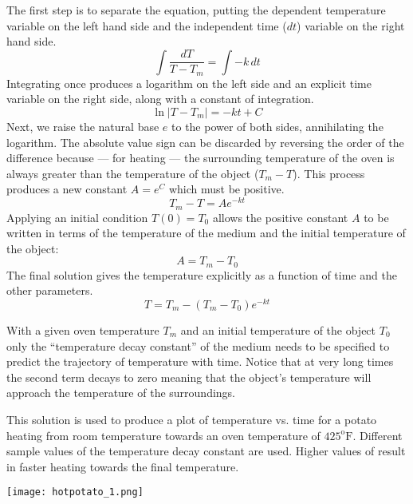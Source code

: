 \documentclass{ximera}
\begin{document}
The first step is to separate the equation, putting the dependent temperature variable on the left hand side and the independent time ($dt$)  variable on the right hand side.
\[
\int\frac{dT}{T-T_m}=\int -k\,dt
\]
Integrating once produces a logarithm on the left side and an explicit time variable on the right side, along with a constant of integration.
\[
\ln|T-T_m|=-kt+C
\]
Next, we raise the natural base $e$ to the power of both sides, annihilating the logarithm.  The absolute value sign can be discarded by reversing the order of the difference because --- for heating --- the surrounding temperature of the oven is always greater than the temperature of the object ($T_m-T$). This process produces a new constant $A=e^C$ which must be positive.
\[
T_m-T=Ae^{-kt}
\] 
Applying an initial condition $T(0)=T_0$ allows the positive constant $A$ to be written in terms of the temperature of the medium and the initial temperature of the object:
\[
A=T_m-T_0
\]
The final solution gives the temperature explicitly as a function of time and the other parameters.
\[
T=T_m-(T_m-T_0)e^{-kt}
\]

With a given oven temperature $T_m$ and an initial temperature of the object $T_0$ only the ``temperature decay constant'' of the medium  needs to be specified to predict the trajectory of temperature with time.  Notice that at very long times the second term decays to zero meaning that the object's temperature will approach the temperature of the surroundings.

This solution is used to produce a plot of temperature vs. time for a potato heating from room temperature towards an oven temperature of $425^{\text{o}}\text{F}$.  Different sample values of the temperature decay constant  are used.  Higher values of  result in faster heating towards the final temperature.

\begin{image}
\texttt{[image: hotpotato\_1.png]}
\end{image}
\end{document}

